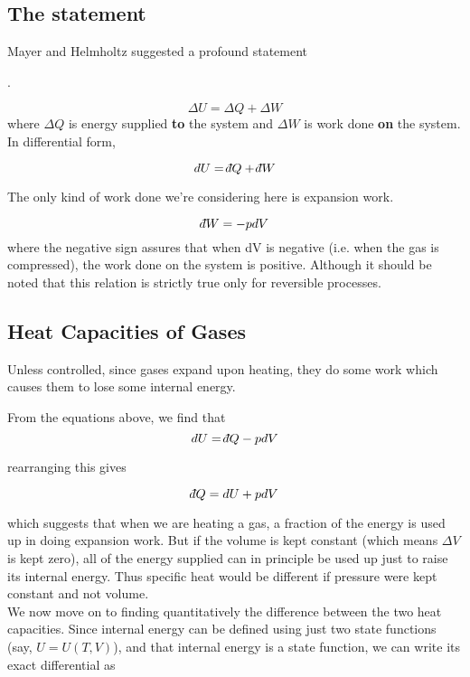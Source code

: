 \documentclass{article}
\def\dbar{{\mathchar'26\mkern-12mu d}}
\begin{document}
	\subsection{The statement}
	Mayer and Helmholtz suggested a profound statement
	\begin{center}
	.
	\end{center}
	$$ \Delta U = \Delta Q + \Delta W $$
	where $\Delta Q$ is energy supplied \textbf{to} the system and $\Delta W$ is work done \textbf{on} the system.\\
	
	In differential form,
	
	$$ dU = \dbar Q + \dbar W $$
 
 	The only kind of work done we're considering here is expansion work.
 	
 	$$ \dbar W = -pdV$$
 	where the negative sign assures that when dV is negative (i.e. when the gas is compressed), the work done on the system is positive. Although it should be noted that this relation is strictly true only for reversible processes.

	\subsection{Heat Capacities of Gases}
	Unless controlled, since gases expand upon heating, they do some work which causes them to lose some internal energy.
	
	From the equations above, we find that
	$$ dU = \dbar Q - pdV $$
	
	rearranging this gives
	
	\begin{equation}
	\label{first}
	 \dbar Q = dU + pdV
	\end{equation}

	
	which suggests that when we are heating a gas, a fraction of the energy is used up in doing expansion work. But if the volume is kept constant (which means $\Delta V$ is kept zero), all of the energy supplied can in principle be used up just to raise its internal energy. Thus specific heat would be different if pressure were kept constant and not volume. \\
	
	We now move on to finding quantitatively the difference between the two heat capacities.
	Since internal energy can be defined using just two state functions (say, $U = U(T, V)$), and that internal energy is a state function, we can write its exact differential as
	
\end{document}
